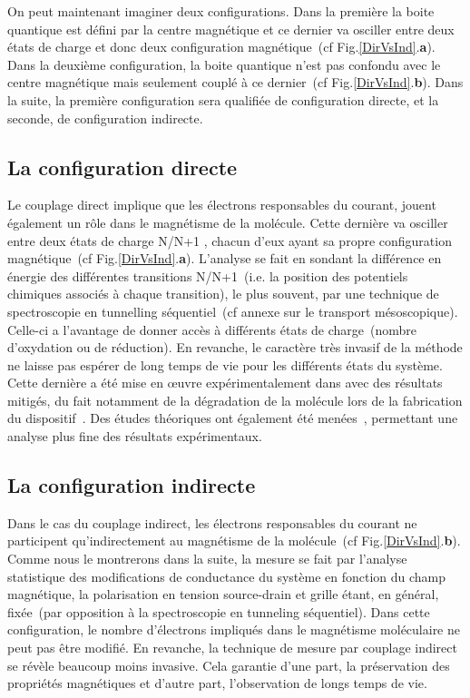 On peut maintenant imaginer deux configurations. Dans la première la boite quantique est défini par la centre magnétique et ce dernier va osciller entre deux états de charge et donc deux configuration magnétique~(cf Fig.\ref{DirVsInd}.\textbf{a}). 
Dans la deuxième configuration, la boite quantique n'est pas confondu avec le centre magnétique mais seulement couplé à ce dernier~(cf Fig.\ref{DirVsInd}.\textbf{b}). Dans la suite, la première configuration sera qualifiée de configuration directe, et la seconde, de configuration indirecte.


\subsection{La configuration directe}
Le couplage direct implique que les électrons responsables du courant, jouent également un rôle dans le magnétisme de la molécule. Cette dernière va osciller entre deux états de charge N/N+1 , chacun d'eux ayant sa propre configuration magnétique~(cf Fig.\ref{DirVsInd}.\textbf{a}). L'analyse se fait en sondant la différence en énergie des différentes transitions N/N+1~(i.e. la position des potentiels chimiques associés à chaque transition), le plus souvent, par une technique de spectroscopie en tunnelling séquentiel~(cf annexe sur le transport mésoscopique). Celle-ci a l'avantage de donner accès à différents états de charge~(nombre d'oxydation ou de réduction). En revanche, le caractère très invasif de la méthode ne laisse pas espérer de long temps de vie pour les différents états du système. Cette dernière a été mise en œuvre expérimentalement dans \cite{Heersche2006,Jo2006,Zyazin2010} avec des résultats mitigés, du fait notamment de la dégradation de la molécule lors de la fabrication du dispositif~\cite{Jo2006}. Des études théoriques ont également été menées~\cite{Timm2006,Timm2007}, permettant une analyse plus fine des résultats expérimentaux.

\subsection{La configuration indirecte}

Dans le cas du couplage indirect, les électrons responsables du courant ne participent qu'indirectement au magnétisme de la molécule~(cf Fig.\ref{DirVsInd}.\textbf{b}). Comme nous le montrerons dans la suite, la mesure se fait par l'analyse statistique des modifications de conductance du système en fonction du champ magnétique, la polarisation en tension source-drain et grille étant, en général, fixée~(par opposition à la spectroscopie en tunneling séquentiel). Dans cette configuration, le nombre d'électrons impliqués dans le magnétisme moléculaire ne peut pas être modifié. En revanche, la technique de mesure par couplage indirect se révèle beaucoup moins invasive. Cela garantie d'une part, la préservation des propriétés magnétiques et d'autre part, l'observation de longs temps de vie. 

